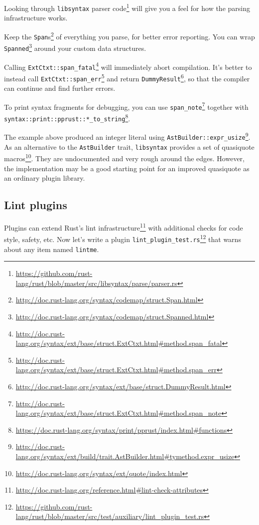 \documentclass[a4paper,]{book}
\renewcommand{\href}[2]{#2\footnote{\url{#1}}}
\begin{document}
Looking through
\href{https://github.com/rust-lang/rust/blob/master/src/libsyntax/parse/parser.rs}{\texttt{libsyntax}
parser code} will give you a feel for how the parsing infrastructure
works.

Keep the
\href{http://doc.rust-lang.org/syntax/codemap/struct.Span.html}{\texttt{Span}s}
of everything you parse, for better error reporting. You can wrap
\href{http://doc.rust-lang.org/syntax/codemap/struct.Spanned.html}{\texttt{Spanned}}
around your custom data structures.

Calling
\href{http://doc.rust-lang.org/syntax/ext/base/struct.ExtCtxt.html\#method.span_fatal}{\texttt{ExtCtxt::span\_fatal}}
will immediately abort compilation. It's better to instead call
\href{http://doc.rust-lang.org/syntax/ext/base/struct.ExtCtxt.html\#method.span_err}{\texttt{ExtCtxt::span\_err}}
and return
\href{http://doc.rust-lang.org/syntax/ext/base/struct.DummyResult.html}{\texttt{DummyResult}},
so that the compiler can continue and find further errors.

To print syntax fragments for debugging, you can use
\href{http://doc.rust-lang.org/syntax/ext/base/struct.ExtCtxt.html\#method.span_note}{\texttt{span\_note}}
together with
\href{https://doc.rust-lang.org/syntax/print/pprust/index.html\#functions}{\texttt{syntax::print::pprust::*\_to\_string}}.

The example above produced an integer literal using
\href{http://doc.rust-lang.org/syntax/ext/build/trait.AstBuilder.html\#tymethod.expr_usize}{\texttt{AstBuilder::expr\_usize}}.
As an alternative to the \texttt{AstBuilder} trait, \texttt{libsyntax}
provides a set of
\href{http://doc.rust-lang.org/syntax/ext/quote/index.html}{quasiquote
macros}. They are undocumented and very rough around the edges. However,
the implementation may be a good starting point for an improved
quasiquote as an ordinary plugin library.

\subsection{Lint plugins}\label{lint-plugins}

Plugins can extend
\href{http://doc.rust-lang.org/reference.html\#lint-check-attributes}{Rust's
lint infrastructure} with additional checks for code style, safety, etc.
Now let's write a plugin
\href{https://github.com/rust-lang/rust/blob/master/src/test/auxiliary/lint_plugin_test.rs}{\texttt{lint\_plugin\_test.rs}}
that warns about any item named \texttt{lintme}.
\end{document}
